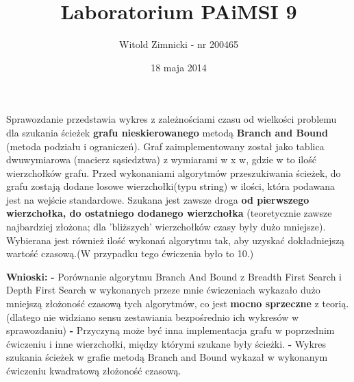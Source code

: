 \documentclass[12pt,a4paper,titlepage]{article}
\title{Laboratorium PAiMSI 9}
\date{18 maja 2014}
\author{Witold Zimnicki - nr 200465}
\begin{document}
	\maketitle
	\pagestyle{empty}
	\pagestyle{headings}
	
	Sprawozdanie przedstawia wykres z zależnościami czasu od wielkości problemu dla szukania ścieżek \textbf{grafu nieskierowanego} metodą \textbf{Branch and Bound} (metoda podziału i ograniczeń). Graf zaimplementowany został jako tablica dwuwymiarowa (macierz sąsiedztwa) z wymiarami w x w, gdzie w to ilość wierzchołków grafu. Przed wykonaniami algorytmów przeszukiwania ścieżek, do grafu zostają dodane losowe wierzchołki(typu string) w ilości, która podawana jest na wejście standardowe. Szukana jest zawsze droga \textbf{od pierwszego wierzchołka, do ostatniego dodanego wierzchołka} (teoretycznie zawsze najbardziej złożona; dla 'bliższych' wierzchołków czasy były dużo mniejsze). Wybierana jest również ilość wykonań algorytmu tak, aby uzyskać dokładniejszą wartość czasową.(W przypadku tego ćwiczenia było to 10.)\newline
	\newline
	
	
	
	
	
\textbf{Wnioski: \newline	\newline}
\textbf{-} Porównanie algorytmu Branch And Bound z Breadth First Search i Depth First Search w wykonanych przeze mnie ćwiczeniach wykazało dużo mniejszą złożoność czasową tych algorytmów, co jest \textbf{mocno sprzeczne} z teorią. (dlatego nie widziano sensu zestawiania bezpośrednio ich wykresów w sprawozdaniu) \newline
\newline
 \textbf{-} Przyczyną może być inna implementacja grafu w poprzednim ćwiczeniu i inne wierzchołki, między którymi szukane były ścieżki.  \newline
 \newline
 \textbf{-} Wykres szukania ścieżek w grafie metodą Branch and Bound wykazał w wykonanym ćwiczeniu kwadratową złożoność czasową. 
\end{document}
